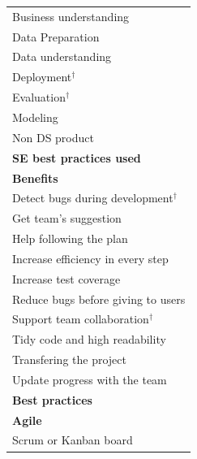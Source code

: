 \documentclass[11pt]{article}
\begin{document}
\begin{longtable}{@{}p{15cm}@{}}
\hspace*{1.5em}Business understanding \\
\hspace*{1.5em}Data Preparation \\
\hspace*{1.5em}Data understanding \\
\hspace*{1.5em}Deployment$^\dagger$ \\
\hspace*{1.5em}Evaluation$^\dagger$ \\
\hspace*{1.5em}Modeling \\
\hspace*{0.0em}Non DS product \\
\hspace*{0.0em}\textbf{SE best practices used} \\
\hspace*{1.5em}\textbf{Benefits} \\
\hspace*{3.0em}Detect bugs during development$^\dagger$ \\
\hspace*{3.0em}Get team's suggestion \\
\hspace*{3.0em}Help following the plan \\
\hspace*{3.0em}Increase efficiency in every step \\
\hspace*{3.0em}Increase test coverage \\
\hspace*{3.0em}Reduce bugs before giving to users \\
\hspace*{3.0em}Support team collaboration$^\dagger$ \\
\hspace*{3.0em}Tidy code and high readability \\
\hspace*{3.0em}Transfering the project \\
\hspace*{3.0em}Update progress with the team \\
\hspace*{1.5em}\textbf{Best practices} \\
\hspace*{3.0em}\textbf{Agile} \\
\hspace*{4.5em}Scrum or Kanban board \\

\end{longtable}
\end{document}
